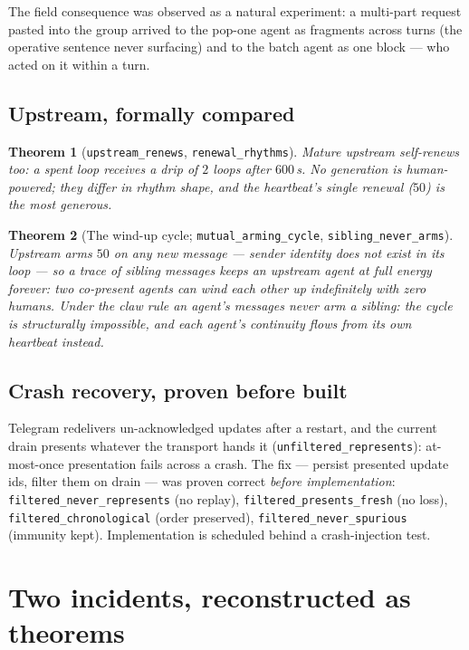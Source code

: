 \documentclass[11pt]{article}
\newtheorem{theorem}{Theorem}[section]
\newcommand{\lean}[1]{\texttt{#1}}
\begin{document}
The field consequence was observed as a natural experiment: a
multi-part request pasted into the group arrived to the pop-one agent as
fragments across turns (the operative sentence never surfacing) and to
the batch agent as one block --- who acted on it within a turn.

\subsection{Upstream, formally compared}

\begin{theorem}[\lean{upstream\_renews}, \lean{renewal\_rhythms}]
Mature upstream self-renews too: a spent loop receives a drip of $2$
loops after $600$\,s. No generation is human-powered; they differ in
rhythm shape, and the heartbeat's single renewal ($50$) is the most
generous.
\end{theorem}

\begin{theorem}[The wind-up cycle; \lean{mutual\_arming\_cycle},
\lean{sibling\_never\_arms}]\label{thm:mutual}
Upstream arms $50$ on \emph{any} new message --- sender identity does not
exist in its loop --- so a trace of sibling messages keeps an upstream
agent at full energy forever: two co-present agents can wind each other
up indefinitely with zero humans. Under the claw rule an agent's
messages never arm a sibling: the cycle is structurally impossible, and
each agent's continuity flows from its own heartbeat instead.
\end{theorem}

\subsection{Crash recovery, proven before built}

Telegram redelivers un-acknowledged updates after a restart, and the
current drain presents whatever the transport hands it
(\lean{unfiltered\_represents}): at-most-once presentation fails across
a crash. The fix --- persist presented update ids, filter them on drain
--- was proven correct \emph{before implementation}:
\lean{filtered\_never\_represents} (no replay),
\lean{filtered\_presents\_fresh} (no loss),
\lean{filtered\_chronological} (order preserved),
\lean{filtered\_never\_spurious} (immunity kept). Implementation is
scheduled behind a crash-injection test.

\section{Two incidents, reconstructed as theorems}\label{sec:incidents}
\end{document}
